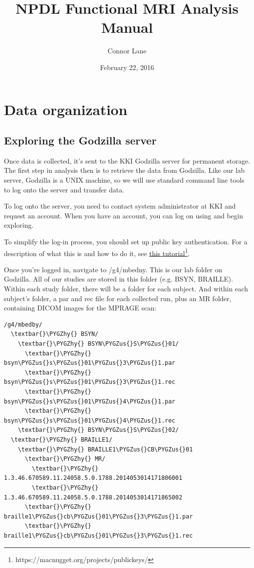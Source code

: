 \documentclass[letterpaper,10pt,openany,oneside]{sphinxmanual}
\title{NPDL Functional MRI Analysis Manual}
\date{February 22, 2016}
\author{Connor Lane}
\def\PYGZus{\char`\_}
\def\PYGZhy{\char`\-}
\begin{document}
\maketitle
\tableofcontents
{}\label{index::doc}



\chapter{Data organization}
\label{data_organization:data-organization}\label{data_organization::doc}\label{data_organization:welcome-to-npdl-functional-mri-analysis-manual-s-documentation}

\section{Exploring the Godzilla server}
\label{data_organization:exploring-the-godzilla-server}
Once data is collected, it's sent to the KKI Godzilla server for permanent
storage. The first step in analysis then is to retrieve the data from Godzilla.
Like our lab server, Godzilla is a UNIX machine, so we will use standard
command line tools to log onto the server and transfer data.

To log onto the server, you need to contact system administrator at KKI and
request an account. When you have an account, you can log on using  and
begin exploring.

To simplify the log-in process, you should set up public key authentication.
For a description of what this is and how to do it, see \href{https://macnugget.org/projects/publickeys/}{this tutorial}\footnote{https://macnugget.org/projects/publickeys/}.

Once you're logged in, navigate to /g4/mbedny. This is our lab folder on
Godzilla. All of our studies are stored in this folder (e.g. BSYN, BRAILLE).
Within each study folder, there will be a folder for each subject. And within
each subject's folder, a par and rec file for each collected run, plus
an MR folder, containing DICOM images for the MPRAGE scan:

\begin{Verbatim}[commandchars=\\\{\}]
/g4/mbedby/
  \textbar{}\PYGZhy{} BSYN/
    \textbar{}\PYGZhy{} BSYN\PYGZus{}S\PYGZus{}01/
      \textbar{}\PYGZhy{} bsyn\PYGZus{}s\PYGZus{}01\PYGZus{}3\PYGZus{}1.par
      \textbar{}\PYGZhy{} bsyn\PYGZus{}s\PYGZus{}01\PYGZus{}3\PYGZus{}1.rec
      \textbar{}\PYGZhy{} bsyn\PYGZus{}s\PYGZus{}01\PYGZus{}4\PYGZus{}1.par
      \textbar{}\PYGZhy{} bsyn\PYGZus{}s\PYGZus{}01\PYGZus{}4\PYGZus{}1.rec
    \textbar{}\PYGZhy{} BSYN\PYGZus{}S\PYGZus{}02/
  \textbar{}\PYGZhy{} BRAILLE1/
    \textbar{}\PYGZhy{} BRAILLE1\PYGZus{}CB\PYGZus{}01
      \textbar{}\PYGZhy{} MR/
        \textbar{}\PYGZhy{} 1.3.46.670589.11.24058.5.0.1788.2014053014171806001
        \textbar{}\PYGZhy{} 1.3.46.670589.11.24058.5.0.1788.2014053014171865002
      \textbar{}\PYGZhy{} braille1\PYGZus{}cb\PYGZus{}01\PYGZus{}3\PYGZus{}1.par
      \textbar{}\PYGZhy{} braille1\PYGZus{}cb\PYGZus{}01\PYGZus{}3\PYGZus{}1.rec
\end{Verbatim}
\end{document}
